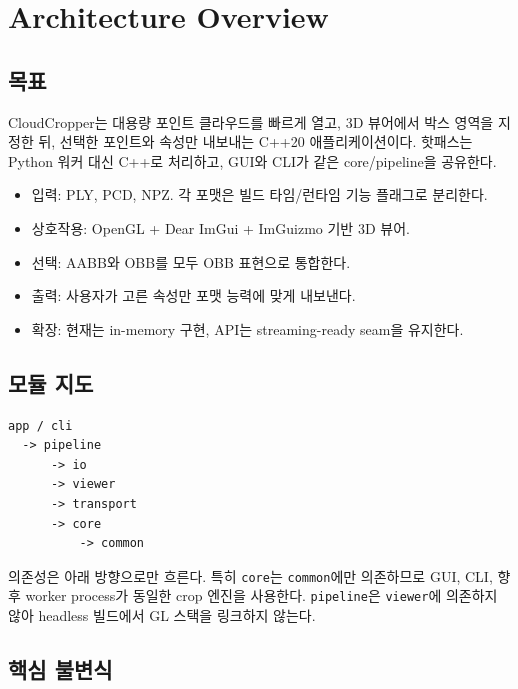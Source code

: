 \chapter{Architecture Overview}

\section{목표}

CloudCropper는 대용량 포인트 클라우드를 빠르게 열고, 3D 뷰어에서 박스
영역을 지정한 뒤, 선택한 포인트와 속성만 내보내는 C++20 애플리케이션이다.
핫패스는 Python 워커 대신 C++로 처리하고, GUI와 CLI가 같은 core/pipeline을
공유한다.

\begin{itemize}
  \item 입력: PLY, PCD, NPZ. 각 포맷은 빌드 타임/런타임 기능 플래그로 분리한다.
  \item 상호작용: OpenGL + Dear ImGui + ImGuizmo 기반 3D 뷰어.
  \item 선택: AABB와 OBB를 모두 OBB 표현으로 통합한다.
  \item 출력: 사용자가 고른 속성만 포맷 능력에 맞게 내보낸다.
  \item 확장: 현재는 in-memory 구현, API는 streaming-ready seam을 유지한다.
\end{itemize}

\section{모듈 지도}

\begin{lstlisting}
app / cli
  -> pipeline
      -> io
      -> viewer
      -> transport
      -> core
          -> common
\end{lstlisting}

의존성은 아래 방향으로만 흐른다. 특히 \texttt{core}는 \texttt{common}에만
의존하므로 GUI, CLI, 향후 worker process가 동일한 crop 엔진을 사용한다.
\texttt{pipeline}은 \texttt{viewer}에 의존하지 않아 headless 빌드에서 GL
스택을 링크하지 않는다.

\section{핵심 불변식}

